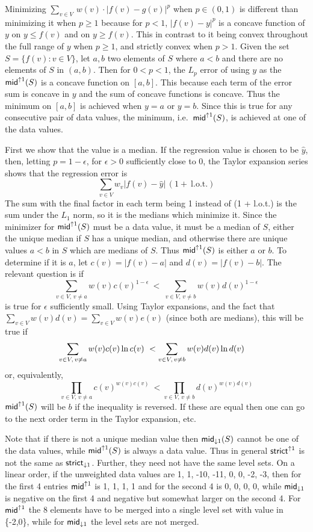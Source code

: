 \documentclass[11pt]{article}
\newcommand{\wmeandown}[2]{\ensuremath{\mathsf{mid}_{\downarrow #1}\ifthenelse{\equal{#2}{}}{}{(#2)}}}
\newcommand{\wmeanup}[2]{\ensuremath{\mathsf{mid}^{\uparrow #1}\ifthenelse{\equal{#2}{}}{}{(#2)}}}
\newcommand{\Strictdown}[2]{\ensuremath{\mathsf{strict}_{\downarrow{#1}}\ifthenelse{\equal{#2}{}}{}{(#2)}}}
\newcommand{\Strictup}[2]{\ensuremath{\mathsf{strict}^{\uparrow {#1}}\ifthenelse{\equal{#2}{}}{}{(#2)}}}
\begin{document}
Minimizing $ \sum_{v \in V}\, w(v) \!\cdot\! |f(v) - g(v)|^p $ when $p \in (0,1)$ is different than minimizing it when $p \geq 1$ because for $p < 1$, $|f(v)-y|^p$ is a concave function of $y$ on $y \leq f(v)$ and on $y \geq f(v)$.
This in contrast to it being convex throughout the full range of $y$ when $p \geq 1$, and strictly convex when $p > 1$.
Given the set $S = \{f(v): v \in V\}$, let $a, b$ two elements of $S$ where $a < b$ and there are no elements of $S$ in $(a,b)$.
Then for $0 < p < 1$, the $L_p$ error of using $y$ as the \wmeanup{1}{S} is a concave function on $[a,b]$.
This because each term of the error sum is concave in $y$ and the sum of concave functions is concave.
Thus the minimum on $[a,b]$ is achieved when $y = a$ or $y=b$.
Since this is true for any consecutive pair of data values, the minimum, i.e.\ \wmeanup{1}{S}, is achieved at one of the data values.

First we show that the value is a median.
If the regression value is chosen to be $\hat{y}$, then, letting $p=1-\epsilon$, for $\epsilon > 0$ sufficiently close to 0, the Taylor expansion series shows that the regression error is
$$
\sum_{v \in V} w_v|f(v)\!-\!\hat{y}|\, (1 + \mathrm{~l.o.t.})
$$
The sum with the final factor in each term being 1 instead of (1 + l.o.t.) is the sum under the $L_1$ norm, so it is the medians which minimize it.
Since the minimizer for \wmeanup{1}{S} must be a data value, it must be a median of $S$, either the unique median if $S$ has a unique median, and otherwise there are unique values $a < b$ in $S$ which are medians of $S$. Thus \wmeanup{1}{S} is either $a$ or $b$.
To determine if it is $a$, let $c(v)=|f(v)-a|$ and $d(v)=|f(v)-b|$.
The relevant question is if 
$$
\sum_{v \in V,\, v \neq a} w(v)c(v)^{1-\epsilon} ~<~ \sum_{v \in V,\, v \neq b} w(v)d(v)^{1-\epsilon}
$$
is true for $\epsilon$ sufficiently small.
Using Taylor expansions, and the fact that $\sum_{v \in V} w(v) d(v) = \sum_{v \in V} w(v) e(v)$ (since both are medians), this will be true if
$$
\sum_{v \in V,\, v \neq a} w(v) c(v) \ln c(v) ~< \sum_{v \in V,\, v \neq b}  w(v) d(v) \ln d(v) \hspace{0.15in}
$$
or, equivalently,
$$
\prod_{v \in V,\, v \neq a} c(v)^{w(v)c(v)}  ~<  \prod_{v \in V,\, v \neq b} d(v)^{w(v)d(v)}
$$
\wmeanup{1}{S} will be $b$ if the inequality is reversed.
If these are equal then one can go to the next order term in the Taylor expansion, etc.

Note that if there is not a unique median value then  \wmeandown{1}{S} cannot be one of the data values, while \wmeanup{1}{S} is always a data value.
Thus in general \Strictup{1}{} is not the same as \Strictdown{1}{}.
Further, they need not have the same level sets.
On a linear order, if the unweighted data values are 1, 1, -10, -11, 0, 0, -2, -3, then for the first 4 entries \wmeanup{1}{} is 1, 1, 1, 1 and for the second 4 is 0, 0, 0, 0, while \wmeandown{1}{} is negative on the first 4 and negative but somewhat larger on the second 4.
For \wmeanup{1}{} the 8 elements have to be merged into a single level set with value in \{-2,0\}, while for \wmeandown{1}{} the level sets are not merged.
\end{document}
